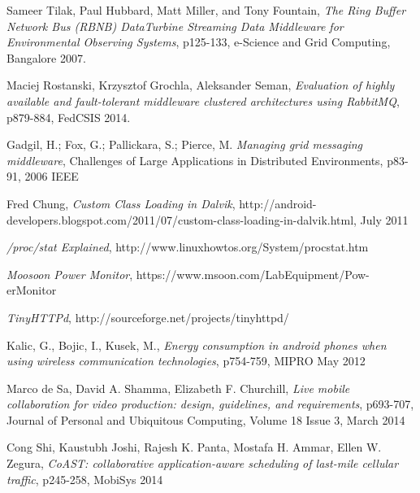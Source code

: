 \documentclass[conference]{IEEEtran}
\begin{document}
%
%
%
\begin{thebibliography}{100}

Sameer Tilak, Paul Hubbard, Matt Miller, and Tony Fountain, \emph{The Ring Buffer Network Bus (RBNB) DataTurbine Streaming Data Middleware for Environmental Observing Systems}, p125-133, e-Science and Grid Computing, Bangalore 2007.

Maciej Rostanski, Krzysztof Grochla, Aleksander Seman, \emph{Evaluation of highly available and fault-tolerant
middleware clustered architectures using RabbitMQ}, p879-884, FedCSIS 2014.

Gadgil, H.; Fox, G.; Pallickara, S.; Pierce, M. \emph{Managing grid messaging middleware}, Challenges of Large Applications in Distributed Environments, p83-91, 2006 IEEE

Fred Chung, \emph{Custom Class Loading in Dalvik}, http://android-developers.blogspot.com/2011/07/custom-class-loading-in-dalvik.html, July 2011

\emph{/proc/stat Explained}, http://www.linuxhowtos.org/System/procstat.htm

\emph{Moosoon Power Monitor}, https://www.msoon.com/LabEquipment/Pow-erMonitor

\emph{TinyHTTPd}, http://sourceforge.net/projects/tinyhttpd/


Kalic, G., Bojic, I., Kusek, M., \emph{Energy consumption in android phones when using wireless communication technologies}, p754-759, MIPRO May 2012

Marco de Sa, David A. Shamma, Elizabeth F. Churchill, \emph{Live mobile collaboration for video production: design, guidelines, and requirements}, p693-707, Journal of Personal and Ubiquitous Computing, Volume 18 Issue 3, March 2014

Cong Shi, Kaustubh Joshi, Rajesh K. Panta, Mostafa H. Ammar, Ellen W. Zegura, \emph{CoAST: collaborative application-aware scheduling of last-mile cellular traffic}, p245-258, MobiSys 2014


\end{thebibliography}
\end{document}
